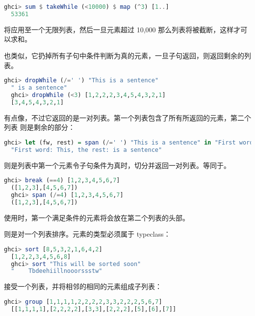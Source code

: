 \documentclass[./main.tex]{subfiles}
\begin{document}
\begin{lstlisting}[language=Haskell]
  ghci> sum $ takeWhile (<10000) $ map (^3) [1..]
  53361
\end{lstlisting}

将应用至一个无限列表，然后一旦元素超过 10,000 那么列表将被截断，这样才可以求和。

也类似，它扔掉所有子句中条件判断为真的元素，一旦子句返回，则返回剩余的列表。

\begin{lstlisting}[language=Haskell]
  ghci> dropWhile (/=' ') "This is a sentence"
  " is a sentence"
  ghci> dropWhile (<3) [1,2,2,2,3,4,5,4,3,2,1]
  [3,4,5,4,3,2,1]
\end{lstlisting}

有点像，不过它返回的是一对列表。第一个列表包含了所有所返回的元素，第二个列表
则是剩余的部分：

\begin{lstlisting}[language=Haskell]
  ghci> let (fw, rest) = span (/=' ') "This is a sentence" in "First word:" ++ fw ++ ", the rest:" ++ rest
  "First word: This, the rest: is a sentence"
\end{lstlisting}

则是列表中第一个元素令子句条件为真时，切分并返回一对列表。等同于。

\begin{lstlisting}[language=Haskell]
  ghci> break (==4) [1,2,3,4,5,6,7]
  ([1,2,3],[4,5,6,7])
  ghci> span (/=4) [1,2,3,4,5,6,7]
  ([1,2,3],[4,5,6,7])
\end{lstlisting}

使用时，第一个满足条件的元素将会放在第二个列表的头部。

则是对一个列表排序。元素的类型必须属于 typeclass：

\begin{lstlisting}[language=Haskell]
  ghci> sort [8,5,3,2,1,6,4,2]
  [1,2,2,3,4,5,6,8]
  ghci> sort "This will be sorted soon"
  "    Tbdeehiillnooorssstw"
\end{lstlisting}

接受一个列表，并将相邻的相同的元素组成子列表：

\begin{lstlisting}[language=Haskell]
  ghci> group [1,1,1,1,2,2,2,2,3,3,2,2,2,5,6,7]
  [[1,1,1,1],[2,2,2,2],[3,3],[2,2,2],[5],[6],[7]]
\end{lstlisting}
\end{document}
